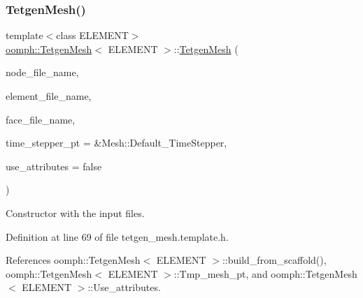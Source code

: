 \subsubsection{\texorpdfstring{Tetgen\+Mesh()}{TetgenMesh()}\hspace{0.1cm}{\footnotesize\ttfamily [2/6]}}
{\footnotesize\ttfamily template$<$class E\+L\+E\+M\+E\+NT$>$ \\
\hyperlink{classoomph_1_1TetgenMesh}{oomph\+::\+Tetgen\+Mesh}$<$ E\+L\+E\+M\+E\+NT $>$\+::\hyperlink{classoomph_1_1TetgenMesh}{Tetgen\+Mesh} (\begin{DoxyParamCaption}\item[{const std\+::string \&}]{node\+\_\+file\+\_\+name,  }\item[{const std\+::string \&}]{element\+\_\+file\+\_\+name,  }\item[{const std\+::string \&}]{face\+\_\+file\+\_\+name,  }\item[{Time\+Stepper $\ast$}]{time\+\_\+stepper\+\_\+pt = {\ttfamily \&Mesh\+:\+:Default\+\_\+TimeStepper},  }\item[{const bool \&}]{use\+\_\+attributes = {\ttfamily false} }\end{DoxyParamCaption})\hspace{0.3cm}{\ttfamily [inline]}}



Constructor with the input files. 



Definition at line 69 of file tetgen\+\_\+mesh.\+template.\+h.



References oomph\+::\+Tetgen\+Mesh$<$ E\+L\+E\+M\+E\+N\+T $>$\+::build\+\_\+from\+\_\+scaffold(), oomph\+::\+Tetgen\+Mesh$<$ E\+L\+E\+M\+E\+N\+T $>$\+::\+Tmp\+\_\+mesh\+\_\+pt, and oomph\+::\+Tetgen\+Mesh$<$ E\+L\+E\+M\+E\+N\+T $>$\+::\+Use\+\_\+attributes.

\mbox{\label{classoomph_1_1TetgenMesh_ace863f736d0dfa0a059b28959fced51d}} 
